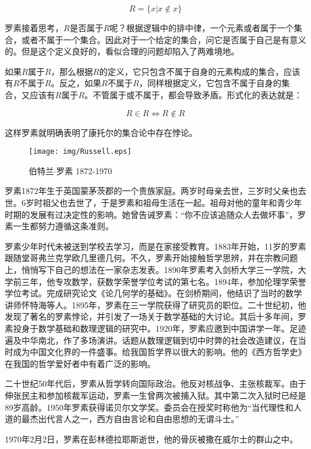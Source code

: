\documentclass{article}
\begin{document}
\[
R = \{ x | x \notin x \}
\]

罗素接着思考，$R$是否属于$R$呢？根据逻辑中的排中律，一个元素或者属于一个集合，或者不属于一个集合。因此对于一个给定的集合，问它是否属于自己是有意义的。但是这个定义良好的，看似合理的问题却陷入了两难境地。

如果$R$属于$R$，那么根据$R$的定义，它只包含不属于自身的元素构成的集合，应该有$R$不属于$R$。反之，如果$R$不属于$R$，同样根据定义，它包含不属于自身的集合，又应该有$R$属于$R$。不管属于或不属于，都会导致矛盾。形式化的表达就是：

\[
R \in R \iff R \notin R
\]

这样罗素就明确表明了康托尔的集合论中存在悖论。

\begin{wrapfigure}{R}{0.3\textwidth}
 \centering
 \texttt{[image: img/Russell.eps]}
 \captionsetup{labelformat=empty}
 \caption{伯特兰$\cdot$罗素 1872-1970}
 \label{fig:Russell}
\end{wrapfigure}

罗素1872年生于英国蒙茅茨郡的一个贵族家庭。两岁时母亲去世，三岁时父亲也去世。6岁时祖父也去世了，于是罗素和祖母生活在一起。祖母对他的童年和青少年时期的发展有过决定性的影响。她曾告诫罗素：“你不应该追随众人去做坏事”，罗素一生都努力遵循这条准则。

罗素少年时代未被送到学校去学习，而是在家接受教育。1883年开始，11岁的罗素跟随堂哥弗兰克学欧几里德几何。不久，罗素开始接触哲学思辨，并在宗教问题上，悄悄写下自己的想法在一家杂志发表。1890年罗素考入剑桥大学三一学院，大学前三年，他专攻数学，获数学荣誉学位考试的第七名。1894年，参加伦理学荣誉学位考试。完成研究论文《论几何学的基础》。在剑桥期间，他结识了当时的数学讲师怀特海等人。1895年，罗素在三一学院获得了研究员的职位。二十世纪初，他发现了著名的罗素悖论，并引发了一场关于数学基础的大讨论。其后十多年间，罗素投身于数学基础和数理逻辑的研究中。1920年，罗素应邀到中国讲学一年。足迹遍及中华南北，作了多场演讲。话题从数理逻辑到切中时弊的社会改造建议，在当时成为中国文化界的一件盛事。给我国哲学界以很大的影响。他的《西方哲学史》在我国的哲学爱好者中有着广泛的影响。

二十世纪50年代后，罗素从哲学转向国际政治。他反对核战争、主张核裁军。由于伸张民主和参加核裁军运动，罗素一生曾两次被捕入狱。其中第二次入狱时已经是89岁高龄。1950年罗素获得诺贝尔文学奖。委员会在授奖时称他为“当代理性和人道的最杰出代言人之一，西方自由言论和自由思想的无谓斗士。”

1970年2月2日，罗素在彭林德拉耶斯逝世，他的骨灰被撒在威尔士的群山之中。
\end{document}
